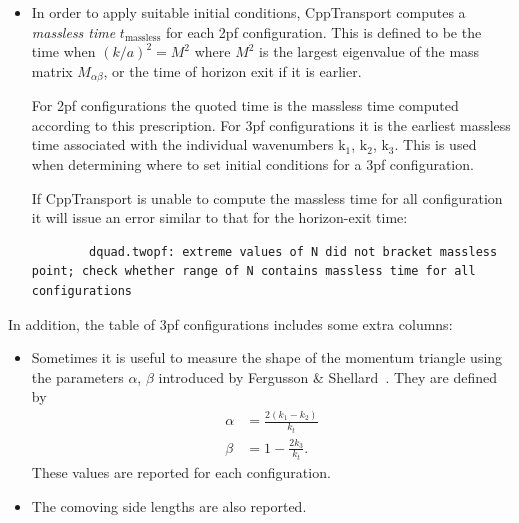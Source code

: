 \documentclass[11pt,a4paper]{article}
\newcommand{\vect}[1]{\bm{\mathrm{{#1}}}}
\newcommand{\tmassless}{t_{\text{massless}}}
\newcommand{\packagefont}{\sffamily}
\newcommand{\CppTransport}{{\packagefont CppTransport}}
\newcommand{\semibold}[1]{{\fontseries{b}\selectfont{#1}}}
\begin{document}
\begin{itemize}
    \item \semibold{Massless time $\tmassless$.}
    \label{enum:massless-time}
    In order to apply suitable initial conditions,
    {\CppTransport} computes
    a \emph{massless time} $\tmassless$ for each 2pf configuration.
    This is defined to be the time when
    $(k/a)^2 = M^2$ where $M^2$ is the largest eigenvalue of the mass
    matrix $M_{\alpha\beta}$,
    or the time of horizon exit if it is earlier.
    
    For 2pf configurations the quoted time is the massless time
    computed according to this prescription.
    For 3pf configurations it is the earliest massless time
    associated with the individual wavenumbers
    $\vect{k}_1$, $\vect{k}_2$, $\vect{k}_3$.
    This is used when determining where to set initial conditions
    for a 3pf configuration.
    
    If {\CppTransport} is unable to compute the massless time
    for all configuration it will issue an error similar to that for
    the horizon-exit time:
    \begin{verbatim}
        dquad.twopf: extreme values of N did not bracket massless point; check whether range of N contains massless time for all configurations    
    \end{verbatim}
\end{itemize}
In addition, the table of 3pf configurations includes some extra columns:
\begin{itemize}
    \item \semibold{Shape parameters $\alpha$, $\beta$.}
    Sometimes it is useful to measure the shape of the momentum triangle
    using the parameters $\alpha$, $\beta$ introduced by
    Fergusson \& Shellard~\cite{Fergusson:2006pr}.
    They are defined by
    \begin{equation}
    \begin{split}
        \alpha & = \frac{2(k_1 - k_2)}{k_t} \\        
        \beta & = 1 - \frac{2k_3}{k_t} .
    \end{split}
    \label{eq:alpha-beta}
    \end{equation}
    These values are reported for each configuration.
    
    \item \semibold{Side lengths $k_1$, $k_2$, $k_3$.}
    The comoving side lengths are also reported.
\end{itemize}
\end{document}
